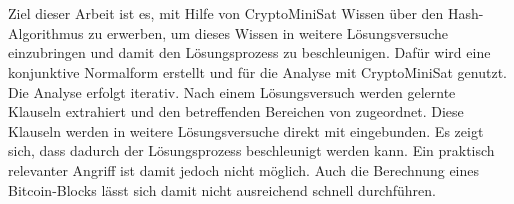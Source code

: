 \section*{\abstractname}

Ziel dieser Arbeit ist es, mit Hilfe von CryptoMiniSat Wissen über den Hash-Algorithmus 
zu erwerben, um dieses Wissen in weitere Lösungsversuche einzubringen und damit den Lösungsprozess zu
beschleunigen. Dafür wird eine konjunktive Normalform erstellt und für die Analyse mit CryptoMiniSat genutzt.
Die Analyse erfolgt iterativ. Nach einem Lösungsversuch werden gelernte Klauseln extrahiert und den
betreffenden Bereichen von  zugeordnet. Diese Klauseln werden in weitere Lösungsversuche direkt
mit eingebunden. Es zeigt sich, dass dadurch der Lösungsprozess beschleunigt werden kann. Ein praktisch
relevanter Angriff ist damit jedoch nicht möglich. Auch die Berechnung eines Bitcoin-Blocks lässt sich
damit nicht ausreichend schnell durchführen.